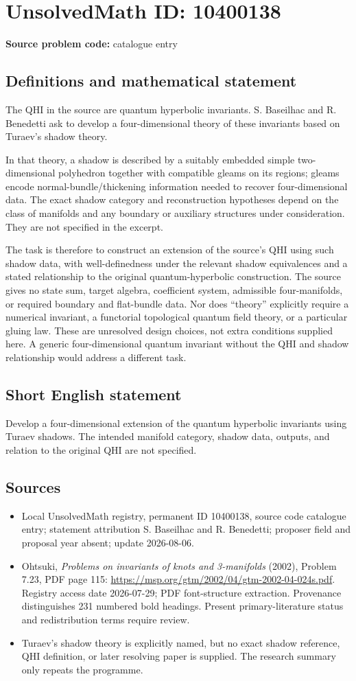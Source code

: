 \documentclass[11pt]{article}
\begin{document}
\section*{UnsolvedMath ID: 10400138}
\textbf{Source problem code:} catalogue entry
\subsection{Definitions and mathematical statement}
The QHI in the source are quantum hyperbolic invariants. S. Baseilhac and R. Benedetti ask to develop a four-dimensional theory of these invariants based on Turaev's shadow theory.

In that theory, a shadow is described by a suitably embedded simple two-dimensional polyhedron together with compatible gleams on its regions; gleams encode normal-bundle/thickening information needed to recover four-dimensional data. The exact shadow category and reconstruction hypotheses depend on the class of manifolds and any boundary or auxiliary structures under consideration. They are not specified in the excerpt.

The task is therefore to construct an extension of the source's QHI using such shadow data, with well-definedness under the relevant shadow equivalences and a stated relationship to the original quantum-hyperbolic construction. The source gives no state sum, target algebra, coefficient system, admissible four-manifolds, or required boundary and flat-bundle data. Nor does ``theory'' explicitly require a numerical invariant, a functorial topological quantum field theory, or a particular gluing law. These are unresolved design choices, not extra conditions supplied here. A generic four-dimensional quantum invariant without the QHI and shadow relationship would address a different task.
\subsection{Short English statement}
Develop a four-dimensional extension of the quantum hyperbolic invariants using Turaev shadows. The intended manifold category, shadow data, outputs, and relation to the original QHI are not specified.
\subsection{Sources}
\begin{itemize}
\item Local UnsolvedMath registry, permanent ID 10400138, source code catalogue entry; statement attribution S. Baseilhac and R. Benedetti; proposer field and proposal year absent; update 2026-08-06.
\item Ohtsuki, \emph{Problems on invariants of knots and 3-manifolds} (2002), Problem 7.23, PDF page 115: \url{https://msp.org/gtm/2002/04/gtm-2002-04-024s.pdf}. Registry access date 2026-07-29; PDF font-structure extraction. Provenance distinguishes 231 numbered bold headings. Present primary-literature status and redistribution terms require review.
\item Turaev's shadow theory is explicitly named, but no exact shadow reference, QHI definition, or later resolving paper is supplied. The research summary only repeats the programme.
\end{itemize}
\end{document}
